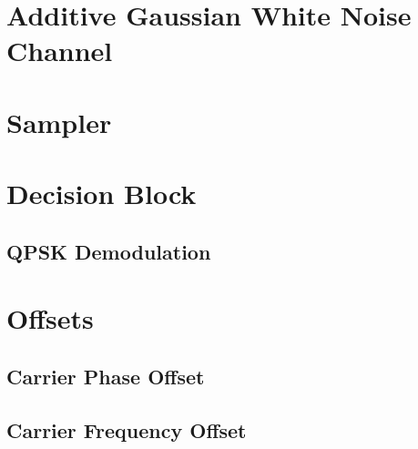\documentclass[]{article}
\begin{document}
\section{Additive Gaussian White Noise Channel}
\label{app:awgn_channel}


\section{Sampler}
\label{app:sampler}


\section{Decision Block}
\label{app:dblocks}
\subsection{QPSK Demodulation}
\label{app:qpsk_demod}


\section{Offsets}
\label{app:offsets}
\subsection{Carrier Phase Offset}
\label{app:phase_offset}


\subsection{Carrier Frequency Offset}
\label{app:freq_offset}

\end{document}
